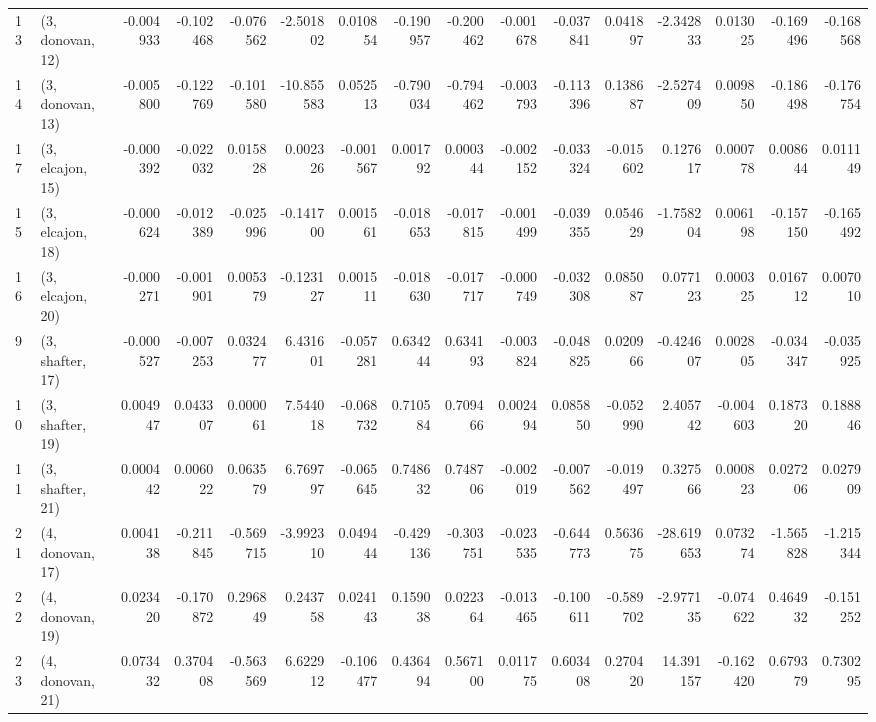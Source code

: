 \begin{tabular}{llrrrrrrrrrrrrrr}
13 &  (3, donovan, 12) &  -0.004933 & -0.102468 & -0.076562 &  -2.501802 &  0.010854 &  -0.190957 & -0.200462 & -0.001678 & -0.037841 &  0.041897 &  -2.342833 &  0.013025 & -0.169496 & -0.168568 \\
14 &  (3, donovan, 13) &  -0.005800 & -0.122769 & -0.101580 & -10.855583 &  0.052513 &  -0.790034 & -0.794462 & -0.003793 & -0.113396 &  0.138687 &  -2.527409 &  0.009850 & -0.186498 & -0.176754 \\
17 &  (3, elcajon, 15) &  -0.000392 & -0.022032 &  0.015828 &   0.002326 & -0.001567 &   0.001792 &  0.000344 & -0.002152 & -0.033324 & -0.015602 &   0.127617 &  0.000778 &  0.008644 &  0.011149 \\
15 &  (3, elcajon, 18) &  -0.000624 & -0.012389 & -0.025996 &  -0.141700 &  0.001561 &  -0.018653 & -0.017815 & -0.001499 & -0.039355 &  0.054629 &  -1.758204 &  0.006198 & -0.157150 & -0.165492 \\
16 &  (3, elcajon, 20) &  -0.000271 & -0.001901 &  0.005379 &  -0.123127 &  0.001511 &  -0.018630 & -0.017717 & -0.000749 & -0.032308 &  0.085087 &   0.077123 &  0.000325 &  0.016712 &  0.007010 \\
9  &  (3, shafter, 17) &  -0.000527 & -0.007253 &  0.032477 &   6.431601 & -0.057281 &   0.634244 &  0.634193 & -0.003824 & -0.048825 &  0.020966 &  -0.424607 &  0.002805 & -0.034347 & -0.035925 \\
10 &  (3, shafter, 19) &   0.004947 &  0.043307 &  0.000061 &   7.544018 & -0.068732 &   0.710584 &  0.709466 &  0.002494 &  0.085850 & -0.052990 &   2.405742 & -0.004603 &  0.187320 &  0.188846 \\
11 &  (3, shafter, 21) &   0.000442 &  0.006022 &  0.063579 &   6.769797 & -0.065645 &   0.748632 &  0.748706 & -0.002019 & -0.007562 & -0.019497 &   0.327566 &  0.000823 &  0.027206 &  0.027909 \\
21 &  (4, donovan, 17) &   0.004138 & -0.211845 & -0.569715 &  -3.992310 &  0.049444 &  -0.429136 & -0.303751 & -0.023535 & -0.644773 &  0.563675 & -28.619653 &  0.073274 & -1.565828 & -1.215344 \\
22 &  (4, donovan, 19) &   0.023420 & -0.170872 &  0.296849 &   0.243758 &  0.024143 &   0.159038 &  0.022364 & -0.013465 & -0.100611 & -0.589702 &  -2.977135 & -0.074622 &  0.464932 & -0.151252 \\
23 &  (4, donovan, 21) &   0.073432 &  0.370408 & -0.563569 &   6.622912 & -0.106477 &   0.436494 &  0.567100 &  0.011775 &  0.603408 &  0.270420 &  14.391157 & -0.162420 &  0.679379 &  0.730295 \\

\end{tabular}
